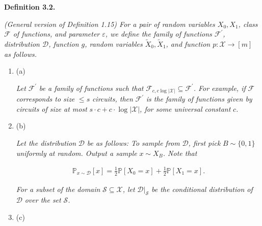 

\par\medskip\noindent\textbf{
\textbf{Definition 3.2}\textbf{.}
}\par



\emph{(General version of Definition 1.15)
For a pair of random variables $X_{0},X_{1}$, class $\mathcal{F}$ of functions, and parameter $\varepsilon$,
we define the family of functions $\mathcal{F}^{\prime}$, distribution $\mathcal{D}$, function $g$, random variables $\widetilde{X}_{0},\widetilde{X}_{1}$, and function $p:\mathcal{X}\to[m]$ as follows.}\par


\begin{enumerate}


\item[] 
(a) 


\emph{Let }$\mathcal{F}^{\prime}$\emph{ be a family of functions such that }$\mathcal{F}_{c,c\log|\mathcal{X}|}\subseteq\mathcal{F}^{\prime}$\emph{. For example, if }$\mathcal{F}$\emph{ corresponds to size }$\leq s$\emph{ circuits, then }$\mathcal{F}^{\prime}$\emph{ is the family of functions given by circuits of size at most }$s\cdot c+c\cdot\log|\mathcal{X}|$\emph{, for some universal constant }$c$\emph{.}\par





\item[] 
(b) 


\emph{Let the distribution }$\mathcal{D}$\emph{ be as follows: To sample from }$\mathcal{D}$\emph{, first pick }$B\sim\{0,1\}$\emph{ uniformly at random. Output a sample }$x\sim X_{B}$\emph{. Note that}\par


\[\begin{gathered}
\mathbb{P}_{x\sim\mathcal{D}}[x]=\frac{1}{2}\mathbb{P}[X_{0}=x]+\frac{1}{2}\mathbb{P}[X_{1}=x].
\end{gathered}\]




\emph{For a subset of the domain }$\mathcal{S}\subseteq\mathcal{X}$\emph{, let }$\mathcal{D}|_{\mathcal{S}}$\emph{ be the conditional distribution of }$\mathcal{D}$\emph{ over the set }$\mathcal{S}$\emph{.}\par





\item[] 
(c) 



\end{enumerate}
